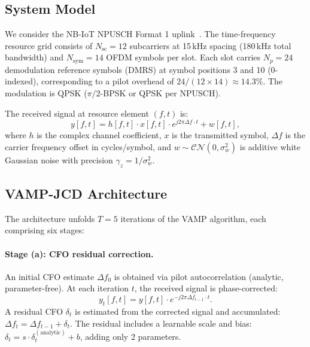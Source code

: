 \documentclass{article}
\begin{document}
\subsection{System Model}

We consider the NB-IoT NPUSCH Format 1 uplink~\cite{3gppTR36763}. The time-frequency resource grid consists of $N_{\mathrm{sc}} = 12$ subcarriers at 15\,kHz spacing (180\,kHz total bandwidth) and $N_{\mathrm{sym}} = 14$ OFDM symbols per slot. Each slot carries $N_p = 24$ demodulation reference symbols (DMRS) at symbol positions 3 and 10 (0-indexed), corresponding to a pilot overhead of $24/(12 \times 14) \approx 14.3\%$. The modulation is QPSK ($\pi/2$-BPSK or QPSK per NPUSCH).

The received signal at resource element $(f, t)$ is:
\begin{equation}
y[f, t] = h[f, t] \cdot x[f, t] \cdot e^{j2\pi \Delta f \cdot t} + w[f, t],
\end{equation}
where $h$ is the complex channel coefficient, $x$ is the transmitted symbol, $\Delta f$ is the carrier frequency offset in cycles/symbol, and $w \sim \mathcal{CN}(0, \sigma_w^2)$ is additive white Gaussian noise with precision $\gamma_z = 1/\sigma_w^2$.

\subsection{VAMP-JCD Architecture}

The architecture unfolds $T = 5$ iterations of the VAMP algorithm, each comprising six stages:

\paragraph{Stage (a): CFO residual correction.}
An initial CFO estimate $\Delta f_0$ is obtained via pilot autocorrelation (analytic, parameter-free). At each iteration $t$, the received signal is phase-corrected:
\begin{equation}
y_t[f, t] = y[f, t] \cdot e^{-j2\pi \Delta f_{t-1} \cdot t}.
\end{equation}
A residual CFO $\delta_t$ is estimated from the corrected signal and accumulated: $\Delta f_t = \Delta f_{t-1} + \delta_t$. The residual includes a learnable scale and bias: $\delta_t = s \cdot \delta_t^{\mathrm{(analytic)}} + b$, adding only 2 parameters.
\end{document}
